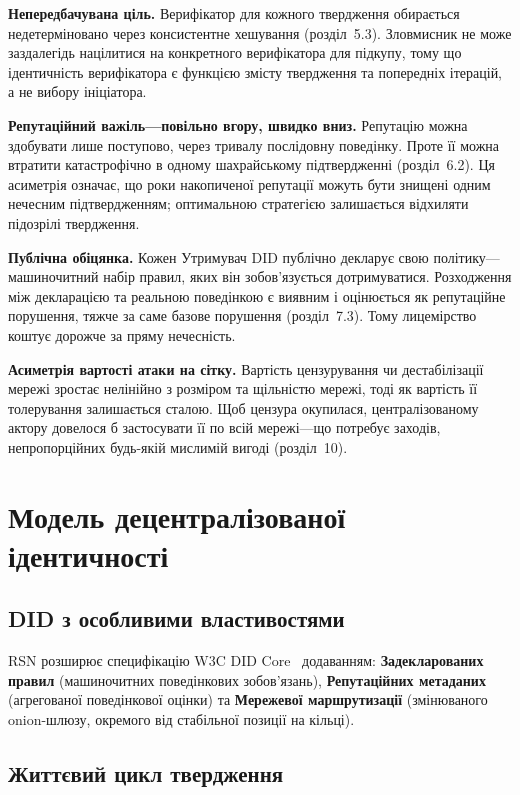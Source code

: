 \documentclass[11pt,a4paper,twocolumn]{article}
\begin{document}
\textbf{Непередбачувана ціль.} Верифікатор для кожного твердження обирається недетерміновано через консистентне хешування (розділ~5.3). Зловмисник не може заздалегідь націлитися на конкретного верифікатора для підкупу, тому що ідентичність верифікатора є функцією змісту твердження та попередніх ітерацій, а не вибору ініціатора.

\textbf{Репутаційний важіль---повільно вгору, швидко вниз.} Репутацію можна здобувати лише поступово, через тривалу послідовну поведінку. Проте її можна втратити катастрофічно в одному шахрайському підтвердженні (розділ~6.2). Ця асиметрія означає, що роки накопиченої репутації можуть бути знищені одним нечесним підтвердженням; оптимальною стратегією залишається відхиляти підозрілі твердження.

\textbf{Публічна обіцянка.} Кожен Утримувач DID публічно декларує свою політику---машиночитний набір правил, яких він зобов'язується дотримуватися. Розходження між декларацією та реальною поведінкою є виявним і оцінюється як репутаційне порушення, тяжче за саме базове порушення (розділ~7.3). Тому лицемірство коштує дорожче за пряму нечесність.

\textbf{Асиметрія вартості атаки на сітку.} Вартість цензурування чи дестабілізації мережі зростає нелінійно з розміром та щільністю мережі, тоді як вартість її толерування залишається сталою. Щоб цензура окупилася, централізованому актору довелося б застосувати її по всій мережі---що потребує заходів, непропорційних будь-якій мислимій вигоді (розділ~10).

\section{Модель децентралізованої ідентичності}

\subsection{DID з особливими властивостями}

RSN розширює специфікацію W3C DID Core~\cite{did2022} додаванням: \textbf{Задекларованих правил} (машиночитних поведінкових зобов'язань), \textbf{Репутаційних метаданих} (агрегованої поведінкової оцінки) та \textbf{Мережевої маршрутизації} (змінюваного onion-шлюзу, окремого від стабільної позиції на кільці).

\subsection{Життєвий цикл твердження}
\end{document}

